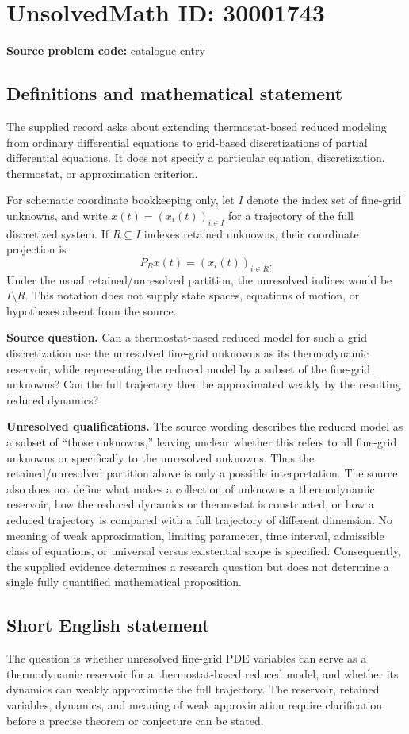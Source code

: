 \documentclass[11pt]{article}
\begin{document}
\section*{UnsolvedMath ID: 30001743}
\textbf{Source problem code:} catalogue entry
\subsection{Definitions and mathematical statement}
The supplied record asks about extending thermostat-based reduced modeling from ordinary differential equations to grid-based discretizations of partial differential equations. It does not specify a particular equation, discretization, thermostat, or approximation criterion.

For schematic coordinate bookkeeping only, let \(I\) denote the index set of fine-grid unknowns, and write \(x(t)=(x_i(t))_{i\in I}\) for a trajectory of the full discretized system. If \(R\subseteq I\) indexes retained unknowns, their coordinate projection is
\[
P_Rx(t)=(x_i(t))_{i\in R}.
\]
Under the usual retained/unresolved partition, the unresolved indices would be \(I\setminus R\). This notation does not supply state spaces, equations of motion, or hypotheses absent from the source.

\textbf{Source question.} Can a thermostat-based reduced model for such a grid discretization use the unresolved fine-grid unknowns as its thermodynamic reservoir, while representing the reduced model by a subset of the fine-grid unknowns? Can the full trajectory then be approximated weakly by the resulting reduced dynamics?

\textbf{Unresolved qualifications.} The source wording describes the reduced model as a subset of ``those unknowns,'' leaving unclear whether this refers to all fine-grid unknowns or specifically to the unresolved unknowns. Thus the retained/unresolved partition above is only a possible interpretation. The source also does not define what makes a collection of unknowns a thermodynamic reservoir, how the reduced dynamics or thermostat is constructed, or how a reduced trajectory is compared with a full trajectory of different dimension. No meaning of weak approximation, limiting parameter, time interval, admissible class of equations, or universal versus existential scope is specified. Consequently, the supplied evidence determines a research question but does not determine a single fully quantified mathematical proposition.
\subsection{Short English statement}
The question is whether unresolved fine-grid PDE variables can serve as a thermodynamic reservoir for a thermostat-based reduced model, and whether its dynamics can weakly approximate the full trajectory. The reservoir, retained variables, dynamics, and meaning of weak approximation require clarification before a precise theorem or conjecture can be stated.
\end{document}
